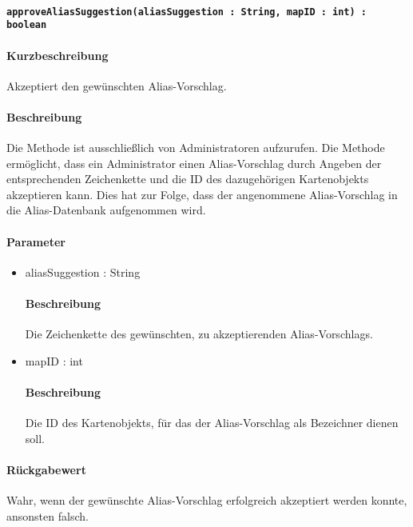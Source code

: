 \paragraph{\texttt{approveAliasSuggestion(aliasSuggestion : String, mapID : int) : boolean}}%
\paragraph*{Kurzbeschreibung}
Akzeptiert den gewünschten Alias-Vorschlag.
\paragraph*{Beschreibung}
Die Methode ist ausschließlich von Administratoren aufzurufen.
Die Methode ermöglicht, dass ein Administrator einen Alias-Vorschlag durch Angeben der entsprechenden Zeichenkette und die ID des dazugehörigen Kartenobjekts akzeptieren kann.
Dies hat zur Folge, dass der angenommene Alias-Vorschlag in die Alias-Datenbank aufgenommen wird.
\paragraph*{Parameter}
\begin{itemize}
	\item aliasSuggestion : String
		\paragraph*{Beschreibung}
		Die Zeichenkette des gewünschten, zu akzeptierenden Alias-Vorschlags.
	\item mapID : int
		\paragraph*{Beschreibung}
		Die ID des Kartenobjekts, für das der Alias-Vorschlag als Bezeichner dienen soll.
\end{itemize}
\paragraph*{Rückgabewert}
Wahr, wenn der gewünschte Alias-Vorschlag erfolgreich akzeptiert werden konnte, ansonsten falsch.

